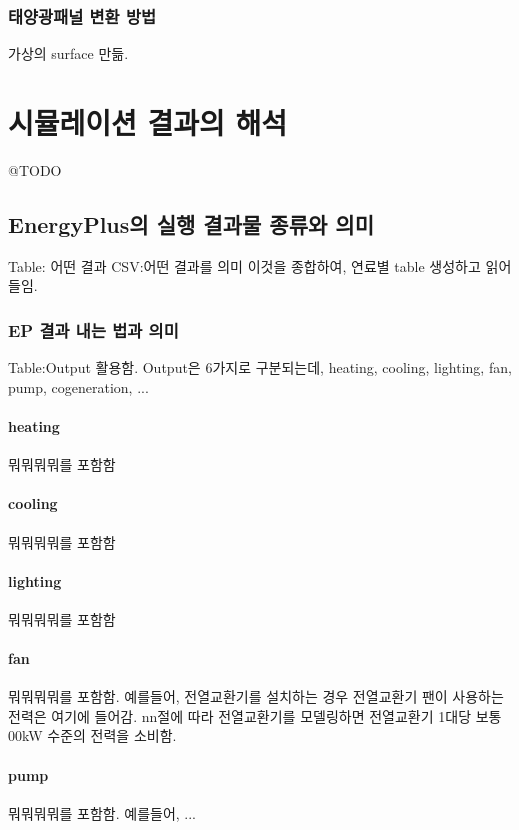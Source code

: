 \subsection{태양광패널 변환 방법}
가상의 surface 만듦.


\chapter{시뮬레이션 결과의 해석} @TODO

\section{EnergyPlus의 실행 결과물 종류와 의미}
Table: 어떤 결과 
CSV:어떤 결과를 의미
이것을 종합하여, 연료별 table 생성하고 읽어들임.

\subsection{EP 결과 내는 법과 의미}
Table:Output 활용함. Output은 6가지로 구분되는데, heating, cooling, lighting, fan, pump, cogeneration, ...

\subsubsection{heating}
뭐뭐뭐뭐를 포함함

\subsubsection{cooling}
뭐뭐뭐뭐를 포함함

\subsubsection{lighting}
뭐뭐뭐뭐를 포함함

\subsubsection{fan}
뭐뭐뭐뭐를 포함함.
예를들어, 전열교환기를 설치하는 경우 전열교환기 팬이 사용하는 전력은 여기에 들어감.
nn절에 따라 전열교환기를 모델링하면 전열교환기 1대당 보통 00kW 수준의 전력을 소비함.

\subsubsection{pump}
뭐뭐뭐뭐를 포함함. 예를들어, ...

